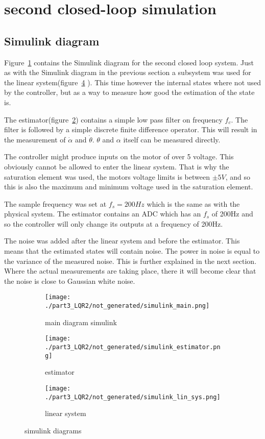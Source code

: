 \section{second closed-loop simulation}

\subsection{Simulink diagram}
	Figure~\ref{fig: simulink diagram main} contains the Simulink diagram for the second closed loop system. Just as with the Simulink diagram in the previous section a subsystem was used for the linear system(figure~\ref{fig: simulink diagram lin system LQR2} ). This time however the internal states where not used by the controller, but as a way to measure how good the estimation of the state is. 
	
	The estimator(figure~\ref{fig: simulink estimator}) contains a simple low pass filter on frequency $f_c$. The filter is followed by a simple discrete finite difference operator. This will result in the measurement of $\dot{\alpha}$ and $\dot{\theta}$. $\theta$ and $\alpha$ itself can be measured directly.
	
	The controller might produce inputs on the motor of over 5 voltage. This obviously cannot be allowed to enter the linear system. That is why the saturation element was used, the motors voltage limits is between $\pm 5V$, and so this is also the maximum and minimum voltage used in the saturation element.
	
	The sample frequency was set at $f_s=200Hz$ which is the same as with the physical system. The estimator contains an ADC which has an $f_s$ of 200Hz and so the controller will only change its outputs at a frequency of 200Hz.
	
	The noise was added after the linear system and before the estimator. This means that the estimated states will contain noise. The power in noise is equal to the variance of the measured noise. This is further explained in the next section. Where the actual measurements are taking place, there it will become clear that the noise is close to Gaussian white noise.

	\begin{figure}[H]
		\centering
		\begin{subfigure}[b]{0.7\textwidth}
			\texttt{[image: ./part3\_LQR2/not\_generated/simulink\_main.png]}
			\caption{main diagram simulink}
			\label{fig: simulink diagram main}
		\end{subfigure}
		\begin{subfigure}[b]{0.45\textwidth}
			\texttt{[image: ./part3\_LQR2/not\_generated/simulink\_estimator.png]}
			\caption{estimator}
			\label{fig: simulink estimator}
		\end{subfigure}
		\begin{subfigure}[b]{0.45\textwidth}
			\texttt{[image: ./part3\_LQR2/not\_generated/simulink\_lin\_sys.png]}
			\caption{linear system}
			\label{fig: simulink diagram lin system LQR2}
		\end{subfigure}
		\caption{simulink diagrams}
	\end{figure}

